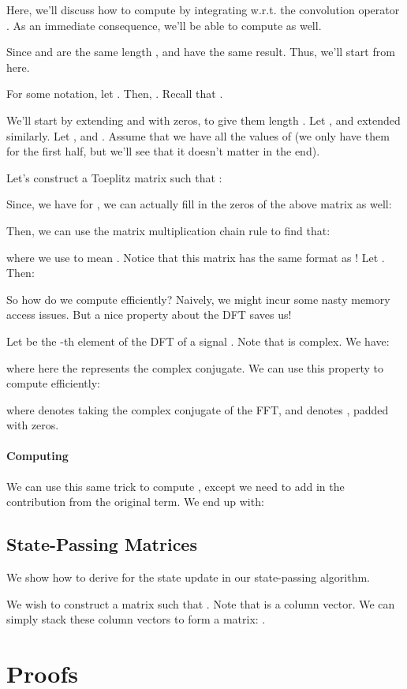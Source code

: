 \documentclass{article}
\begin{document}
Here, we'll discuss how to compute  by integrating w.r.t. the convolution operator .
As an immediate consequence, we'll be able to compute  as well.

Since  and  are the same length ,  and  have the same result.
Thus, we'll start from  here.

For some notation, let .
Then, .
Recall that .

We'll start by extending  and  with zeros, to give them length .
Let , and  extended similarly.
Let , and .
Assume that we have all the values of  (we only have them for the first half, but we'll see that it doesn't matter in the end).

Let's construct a Toeplitz matrix  such that :

Since, we have  for , we can actually fill in the zeros of the above matrix as well:

Then, we can use the matrix multiplication chain rule to find that:

where we use  to mean .
Notice that this matrix has the same format as !
Let .
Then:

So how do we compute  efficiently?
Naively, we might incur some nasty memory access issues.
But a nice property about the DFT saves us!

Let  be the -th element of the DFT of a signal .
Note that  is complex.
We have:

where here the  represents the complex conjugate.
We can use this property to compute  efficiently:

where  denotes taking the complex conjugate of the FFT, and  denotes , padded with zeros.

\paragraph{Computing }
We can use this same trick to compute , except we need to add in the contribution from the original  term.
We end up with:


\subsection{State-Passing Matrices}
\label{sec:state-passing-matrices}

We show how to derive  for the state update in our state-passing algorithm.

We wish to construct a matrix  such that .
Note that  is a column vector.
We can simply stack these column vectors to form a matrix:
.
 \section{Proofs}
\label{sec:proofs}
\end{document}

